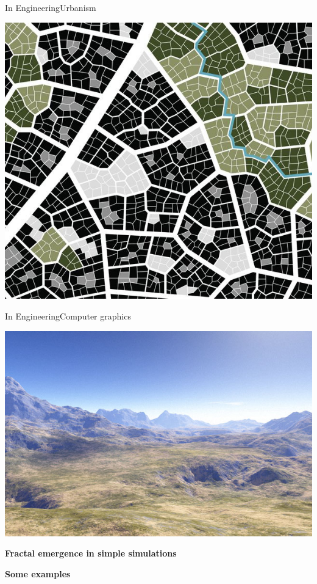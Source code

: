\documentclass[usenames, dvipsnames, aspectratio=169]{beamer}
\begin{document}
\begin{frame}[t, c]{In Engineering}{Urbanism}
  \centering
  \vfill

  \includegraphics[width=.5\textwidth]{city_planning}

  \vfill
\end{frame}


\begin{frame}[t, c]{In Engineering}{Computer graphics}
  \centering
  \vfill

  \includegraphics[width=.666\textwidth]{fractal_landscape}

  \vfill
\end{frame}


{



  \begin{frame}[fragile]{}{}
    \vfill
    \centering
    \Large
    \textbf{\color{black} Fractal emergence in simple simulations}

    \bigskip

    \large
    \textbf{\color{gray} Some examples}
    \vfill
  \end{frame}
}
\end{document}
